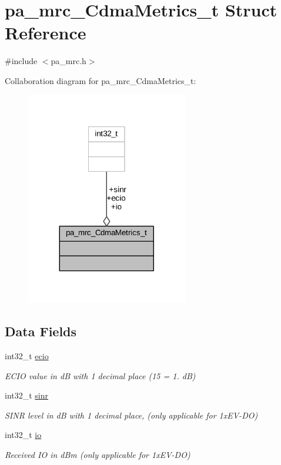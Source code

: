 \hypertarget{structpa__mrc___cdma_metrics__t}{}\section{pa\+\_\+mrc\+\_\+\+Cdma\+Metrics\+\_\+t Struct Reference}
\label{structpa__mrc___cdma_metrics__t}


{\ttfamily \#include $<$pa\+\_\+mrc.\+h$>$}



Collaboration diagram for pa\+\_\+mrc\+\_\+\+Cdma\+Metrics\+\_\+t\+:
\nopagebreak
\begin{figure}[H]
\begin{center}
\leavevmode
\includegraphics[width=200pt]{structpa__mrc___cdma_metrics__t__coll__graph}
\end{center}
\end{figure}
\subsection*{Data Fields}
\begin{DoxyCompactItemize}
\item 
int32\+\_\+t \hyperlink{structpa__mrc___cdma_metrics__t_ac1d427700444e30bc9aa1d5e6b6b958e}{ecio}
\begin{DoxyCompactList}\small\item\em E\+C\+IO value in dB with 1 decimal place (15 = 1. dB) \end{DoxyCompactList}\item 
int32\+\_\+t \hyperlink{structpa__mrc___cdma_metrics__t_a87713664d61eb173e6946ba913cfcb7f}{sinr}
\begin{DoxyCompactList}\small\item\em S\+I\+NR level in dB with 1 decimal place, (only applicable for 1x\+E\+V-\/\+DO) \end{DoxyCompactList}\item 
int32\+\_\+t \hyperlink{structpa__mrc___cdma_metrics__t_ab962f1ecb4d1f515b9092160eeca1719}{io}
\begin{DoxyCompactList}\small\item\em Received IO in d\+Bm (only applicable for 1x\+E\+V-\/\+DO) \end{DoxyCompactList}\end{DoxyCompactItemize}


